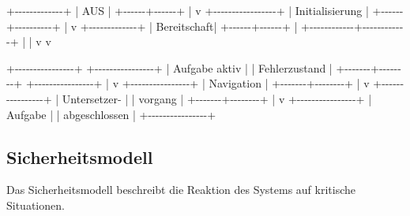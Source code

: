 \documentclass[
  a4paper,
  12pt,
  DIV=12,        %
  parskip=half,  %
  headings=small %
]{scrartcl}
\theoremstyle{definition}
\theoremstyle{definition}
\newenvironment{Shaded}{}{}
\newcommand{\NormalTok}[1]{#1}
\begin{document}
\begin{Shaded}
\begin{Highlighting}[]
\NormalTok{                +{-}{-}{-}{-}{-}{-}{-}{-}{-}{-}{-}{-}{-}+}
\NormalTok{                | AUS         |}
\NormalTok{                +{-}{-}{-}{-}{-}{-}+{-}{-}{-}{-}{-}{-}+}
\NormalTok{                       |}
\NormalTok{                       v}
\NormalTok{                +{-}{-}{-}{-}{-}{-}{-}{-}{-}{-}{-}{-}{-}{-}{-}{-}{-}+}
\NormalTok{                | Initialisierung |}
\NormalTok{                +{-}{-}{-}{-}{-}{-}+{-}{-}{-}{-}{-}{-}{-}{-}{-}{-}+}
\NormalTok{                       |}
\NormalTok{                       v}
\NormalTok{                +{-}{-}{-}{-}{-}{-}{-}{-}{-}{-}{-}{-}{-}+}
\NormalTok{                | Bereitschaft|}
\NormalTok{                +{-}{-}{-}{-}{-}{-}+{-}{-}{-}{-}{-}{-}+}
\NormalTok{                       |}
\NormalTok{          +{-}{-}{-}{-}{-}{-}{-}{-}{-}{-}{-}{-}+{-}{-}{-}{-}{-}{-}{-}{-}{-}{-}{-}{-}+}
\NormalTok{          |                         |}
\NormalTok{          v                         v}

\NormalTok{+{-}{-}{-}{-}{-}{-}{-}{-}{-}{-}{-}{-}{-}{-}{-}{-}+        +{-}{-}{-}{-}{-}{-}{-}{-}{-}{-}{-}{-}{-}{-}{-}{-}+}
\NormalTok{| Aufgabe aktiv  |        | Fehlerzustand  |}
\NormalTok{+{-}{-}{-}{-}{-}{-}{-}+{-}{-}{-}{-}{-}{-}{-}{-}+        +{-}{-}{-}{-}{-}{-}{-}{-}{-}{-}{-}{-}{-}{-}{-}{-}+}
\NormalTok{        |}
\NormalTok{        v}
\NormalTok{+{-}{-}{-}{-}{-}{-}{-}{-}{-}{-}{-}{-}{-}{-}{-}{-}+}
\NormalTok{| Navigation     |}
\NormalTok{+{-}{-}{-}{-}{-}{-}{-}+{-}{-}{-}{-}{-}{-}{-}{-}+}
\NormalTok{        |}
\NormalTok{        v}
\NormalTok{+{-}{-}{-}{-}{-}{-}{-}{-}{-}{-}{-}{-}{-}{-}{-}{-}+}
\NormalTok{| Untersetzer{-}   |}
\NormalTok{| vorgang        |}
\NormalTok{+{-}{-}{-}{-}{-}{-}{-}+{-}{-}{-}{-}{-}{-}{-}{-}+}
\NormalTok{        |}
\NormalTok{        v}
\NormalTok{+{-}{-}{-}{-}{-}{-}{-}{-}{-}{-}{-}{-}{-}{-}{-}{-}+}
\NormalTok{| Aufgabe        |}
\NormalTok{| abgeschlossen  |}
\NormalTok{+{-}{-}{-}{-}{-}{-}{-}{-}{-}{-}{-}{-}{-}{-}{-}{-}+}
\end{Highlighting}
\end{Shaded}

\subsection{Sicherheitsmodell}\label{sicherheitsmodell}

Das Sicherheitsmodell beschreibt die Reaktion des Systems auf kritische
Situationen.
\end{document}
